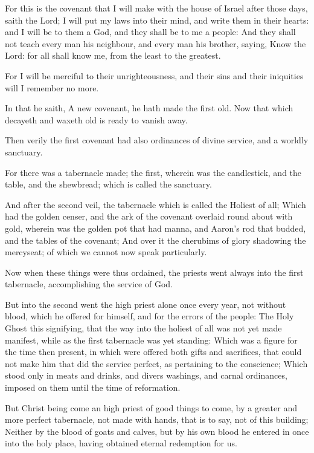 \Verse For this is the covenant that I will make with the house of Israel after those days, saith the Lord; I will put my laws into their mind, and write them in their hearts: and I will be to them a God, and they shall be to me a people: \Verse And they shall not teach every man his neighbour, and every man his brother, saying, Know the Lord: for all shall know me, from the least to the greatest.

\Verse For I will be merciful to their unrighteousness, and their sins and their iniquities will I remember no more.

\Verse In that he saith, A new covenant, he hath made the first old. Now that which decayeth and waxeth old is ready to vanish away.


\Chapter
\Verse Then verily the first covenant had also ordinances of divine service, and a worldly sanctuary.

\Verse For there was a tabernacle made; the first, wherein was the candlestick, and the table, and the shewbread; which is called the sanctuary.

\Verse And after the second veil, the tabernacle which is called the Holiest of all; \Verse Which had the golden censer, and the ark of the covenant overlaid round about with gold, wherein was the golden pot that had manna, and Aaron's rod that budded, and the tables of the covenant; \Verse And over it the cherubims of glory shadowing the mercyseat; of which we cannot now speak particularly.

\Verse Now when these things were thus ordained, the priests went always into the first tabernacle, accomplishing the service of God.

\Verse But into the second went the high priest alone once every year, not without blood, which he offered for himself, and for the errors of the people: \Verse The Holy Ghost this signifying, that the way into the holiest of all was not yet made manifest, while as the first tabernacle was yet standing: \Verse Which was a figure for the time then present, in which were offered both gifts and sacrifices, that could not make him that did the service perfect, as pertaining to the conscience; \Verse Which stood only in meats and drinks, and divers washings, and carnal ordinances, imposed on them until the time of reformation.

\Verse But Christ being come an high priest of good things to come, by a greater and more perfect tabernacle, not made with hands, that is to say, not of this building; \Verse Neither by the blood of goats and calves, but by his own blood he entered in once into the holy place, having obtained eternal redemption for us.

